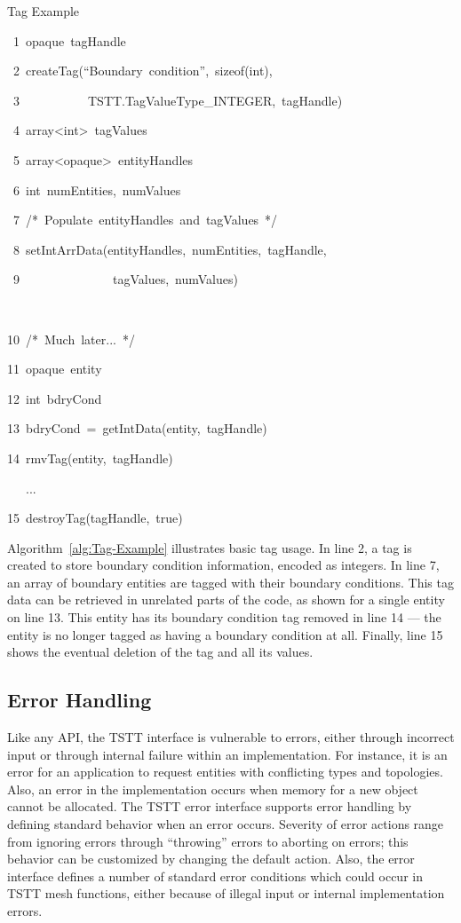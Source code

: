 %
\begin{algorithm}

\caption{Tag Example\label{alg:Tag-Example}}

\begin{lyxcode}
~1~opaque~tagHandle

~2~createTag({}``Boundary~condition'',~sizeof(int),~~

~3~~~~~~~~~~~TSTT.TagValueType\_INTEGER,~tagHandle)



~4~array<int>~tagValues

~5~array<opaque>~entityHandles

~6~int~numEntities,~numValues

~7~/{*}~Populate~entityHandles~and~tagValues~{*}/

~8~setIntArrData(entityHandles,~numEntities,~tagHandle,

~9~~~~~~~~~~~~~~~tagValues,~numValues)

~

10~/{*}~Much~later...~{*}/

11~opaque~entity

12~int~bdryCond

13~bdryCond~=~getIntData(entity,~tagHandle)

14~rmvTag(entity,~tagHandle)

~~~...

15~destroyTag(tagHandle,~true)


\end{lyxcode}

\end{algorithm}

Algorithm~\ref{alg:Tag-Example} illustrates basic tag usage. In
line 2, a tag is created to store boundary condition information,
encoded as integers. In line 7, an array of boundary entities are
tagged with their boundary conditions. This tag data can be retrieved
in unrelated parts of the code, as shown for a single entity on line
13. This entity has its boundary condition tag removed in line 14
--- the entity is no longer tagged as having a boundary condition
at all. Finally, line 15 shows the eventual deletion of the tag and
all its values.


\subsection{Error Handling\label{sub:Error-Handling}}

Like any API, the TSTT interface is vulnerable to errors, either through
incorrect input or through internal failure within an implementation.
For instance, it is an error for an application to request entities
with conflicting types and topologies. Also, an error in the implementation
occurs when memory for a new object cannot be allocated. The TSTT
error interface supports error handling by defining standard behavior
when an error occurs. Severity of error actions range from ignoring
errors through ``throwing'' errors to aborting on errors; this
behavior can be customized by changing the default action. Also, the
error interface defines a number of standard error conditions which
could occur in TSTT mesh functions, either because of illegal input
or internal implementation errors. 


